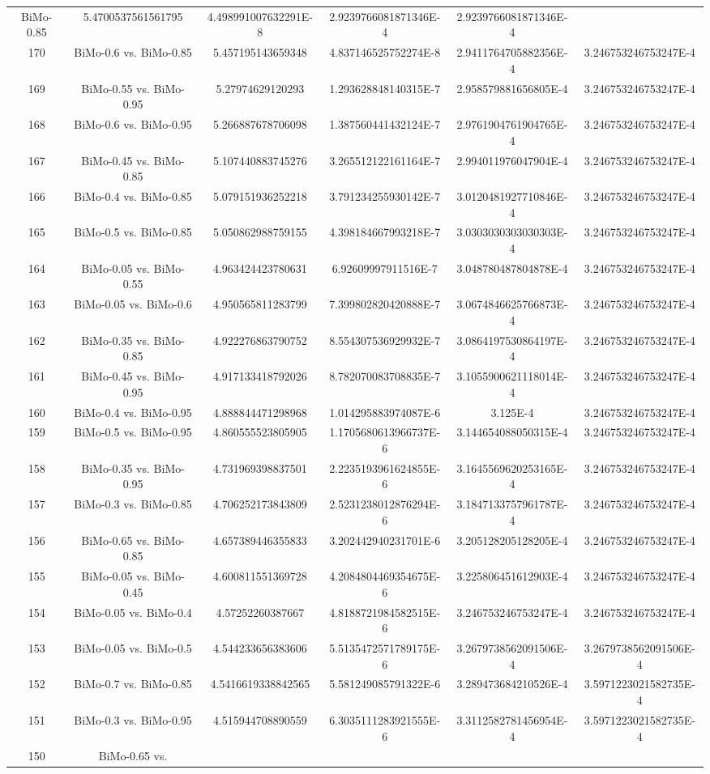 \documentclass[a4paper,10pt]{article}
\begin{document}
\begin{landscape}
\begin{table}[!htp]
\begin{tabular}{cccccc}
BiMo-0.85&5.4700537561561795&4.498991007632291E-8&2.9239766081871346E-4&2.9239766081871346E-4\\170&BiMo-0.6 vs. BiMo-0.85&5.457195143659348&4.837146525752274E-8&2.9411764705882356E-4&3.246753246753247E-4\\169&BiMo-0.55 vs. BiMo-0.95&5.27974629120293&1.293628848140315E-7&2.958579881656805E-4&3.246753246753247E-4\\168&BiMo-0.6 vs. BiMo-0.95&5.266887678706098&1.387560441432124E-7&2.9761904761904765E-4&3.246753246753247E-4\\167&BiMo-0.45 vs. BiMo-0.85&5.107440883745276&3.265512122161164E-7&2.994011976047904E-4&3.246753246753247E-4\\166&BiMo-0.4 vs. BiMo-0.85&5.079151936252218&3.791234255930142E-7&3.0120481927710846E-4&3.246753246753247E-4\\165&BiMo-0.5 vs. BiMo-0.85&5.050862988759155&4.398184667993218E-7&3.0303030303030303E-4&3.246753246753247E-4\\164&BiMo-0.05 vs. BiMo-0.55&4.963424423780631&6.92609997911516E-7&3.048780487804878E-4&3.246753246753247E-4\\163&BiMo-0.05 vs. BiMo-0.6&4.950565811283799&7.399802820420888E-7&3.0674846625766873E-4&3.246753246753247E-4\\162&BiMo-0.35 vs. BiMo-0.85&4.922276863790752&8.554307536929932E-7&3.0864197530864197E-4&3.246753246753247E-4\\161&BiMo-0.45 vs. BiMo-0.95&4.917133418792026&8.782070083708835E-7&3.1055900621118014E-4&3.246753246753247E-4\\160&BiMo-0.4 vs. BiMo-0.95&4.888844471298968&1.014295883974087E-6&3.125E-4&3.246753246753247E-4\\159&BiMo-0.5 vs. BiMo-0.95&4.860555523805905&1.1705680613966737E-6&3.144654088050315E-4&3.246753246753247E-4\\158&BiMo-0.35 vs. BiMo-0.95&4.731969398837501&2.2235193961624855E-6&3.1645569620253165E-4&3.246753246753247E-4\\157&BiMo-0.3 vs. BiMo-0.85&4.706252173843809&2.5231238012876294E-6&3.1847133757961787E-4&3.246753246753247E-4\\156&BiMo-0.65 vs. BiMo-0.85&4.657389446355833&3.202442940231701E-6&3.205128205128205E-4&3.246753246753247E-4\\155&BiMo-0.05 vs. BiMo-0.45&4.600811551369728&4.2084804469354675E-6&3.225806451612903E-4&3.246753246753247E-4\\154&BiMo-0.05 vs. BiMo-0.4&4.57252260387667&4.8188721984582515E-6&3.246753246753247E-4&3.246753246753247E-4\\153&BiMo-0.05 vs. BiMo-0.5&4.544233656383606&5.5135472571789175E-6&3.2679738562091506E-4&3.2679738562091506E-4\\152&BiMo-0.7 vs. BiMo-0.85&4.5416619338842565&5.581249085791322E-6&3.289473684210526E-4&3.5971223021582735E-4\\151&BiMo-0.3 vs. BiMo-0.95&4.515944708890559&6.3035111283921555E-6&3.3112582781456954E-4&3.5971223021582735E-4\\150&BiMo-0.65 vs. 
\end{tabular}
\end{table}
\end{landscape}
\end{document}
